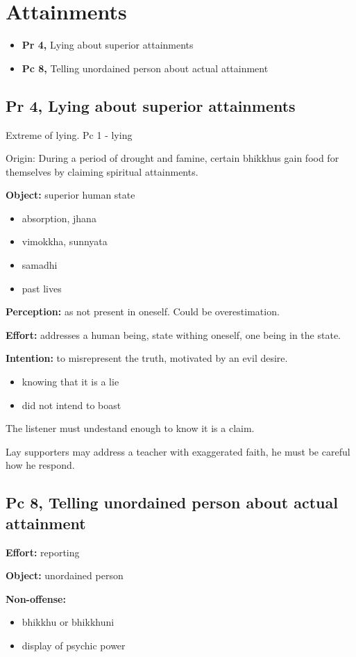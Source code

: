 \chapter{Attainments}

\begin{itemize}
\tightlist
\item
  \textbf{Pr 4,} Lying about superior attainments
\item
  \textbf{Pc 8,} Telling unordained person about actual attainment
\end{itemize}

\section{Pr 4, Lying about superior attainments}

Extreme of lying. Pc 1 - lying

Origin: During a period of drought and famine, certain bhikkhus gain
food for themselves by claiming spiritual attainments.

\textbf{Object:} superior human state

\begin{itemize}
\tightlist
\item
  absorption, jhana
\item
  vimokkha, sunnyata
\item
  samadhi
\item
  past lives
\end{itemize}

\textbf{Perception:} as not present in oneself. Could be overestimation.

\textbf{Effort:} addresses a human being, state withing oneself, one
being in the state.

\textbf{Intention:} to misrepresent the truth, motivated by an evil
desire.

\begin{itemize}
\tightlist
\item
  knowing that it is a lie
\item
  did not intend to boast
\end{itemize}

The listener must undestand enough to know it is a claim.

Lay supporters may address a teacher with exaggerated faith, he must be
careful how he respond.

\section{Pc 8, Telling unordained person about actual attainment}

\textbf{Effort:} reporting

\textbf{Object:} unordained person

\textbf{Non-offense:}

\begin{itemize}
\tightlist
\item
  bhikkhu or bhikkhuni
\item
  display of psychic power
\end{itemize}

